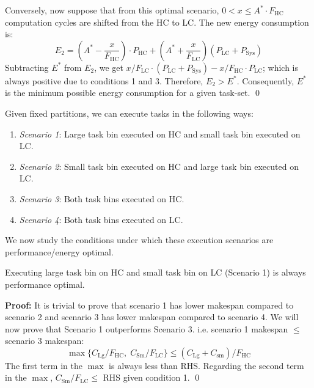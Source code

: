 Conversely, now suppose that from this optimal scenario, $0< x\leq A^*\cdot F_\mathrm{HC}$ computation cycles are shifted from the HC to LC. The new energy consumption is:
\begin{equation*}
E_2= (A^*- \frac{x}{F_\mathrm{HC}})  \cdot P_\mathrm{HC} +  (A^*+ \frac{x}{F_\mathrm{LC}})(P_\mathrm{LC} + P_\mathrm{Sys}) 
\end{equation*} 
Subtracting $E^*$ from $E_2$, we get $x/F_\mathrm{LC}\cdot(P_\mathrm{LC}+P_\mathrm{Sys}) - x/F_\mathrm{HC}\cdot P_\mathrm{LC}$; which is always positive due to conditions 1 and 3. Therefore, $E_2> E^*$. Consequently, $E^*$ is the minimum possible energy consumption for a given task-set. \qed

Given fixed partitions, we can execute tasks in the following ways:
\begin{enumerate}
\item \textit{Scenario 1}: Large task bin executed on HC and small task bin executed on LC.
\item \textit{Scenario 2}: Small task bin executed on HC and large task bin executed on LC.
\item \textit{Scenario 3}: Both task bins executed on HC. 
\item \textit{Scenario 4}: Both task bins executed on LC. 
\end{enumerate}
We now study the conditions under which these execution scenarios are performance/energy optimal.

\begin{theorem}\label{thm: parallel-perf}
Executing large task bin on HC and small task bin on LC (Scenario 1) is always performance optimal. 
\end{theorem}
\noindent \textbf{Proof:} It is trivial to prove that scenario 1 has lower makespan compared to scenario 2 and scenario 3 has lower makespan compared to scenario 4. We will now prove that Scenario 1 outperforms Scenario 3. i.e. scenario 1 makespan $\leq$ scenario 3 makespan:
\[
\max\{C_\mathrm{Lg}/F_{\mathrm{HC}}, \;C_\mathrm{Sm}/F_{\mathrm{LC}} \}\leq (C_\mathrm{Lg}+C_\mathrm{sm})/F_\mathrm{HC} 
\]
The first term in the $\max$ is always less than RHS. Regarding the second term in the $\max$, $C_\mathrm{Sm}/F_{\mathrm{LC}}\leq $ RHS given condition 1.  \qed


